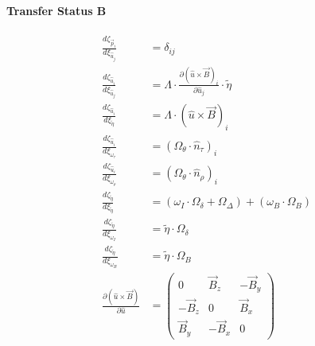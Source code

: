 \documentclass[review]{elsarticle}
\begin{document}
\paragraph{Transfer Status B}
\begin{equation} \begin{alignedat}{-1}
    \frac{d\zeta_{\vec{p}_{i}}}{d\xi_{\hat{u}_{j}}}&=\delta_{ij} \\
    \frac{d\zeta_{\hat{u}_{i}}}{d\xi_{\hat{u}_{j}}}&=\Lambda\cdot\frac{\partial(\hat{u}\times\vec{B})_{i}}{\partial\hat{u}_{j}}\cdot\tilde{\eta} \\
    \frac{d\zeta_{\hat{u}_{i}}}{d\xi_{\tilde{\eta}}}&=\Lambda\cdot(\hat{u}\times\vec{B})_{i} \\
    \frac{d\zeta_{\hat{u}_{i}}}{d\xi_{\omega_{\tau}}}&=(\Omega_{\theta}\cdot\hat{n}_{\tau})_{i} \\
    \frac{d\zeta_{\hat{u}_{i}}}{d\xi_{\omega_{\rho}}}&=(\Omega_{\theta}\cdot\hat{n}_{\rho})_{i} \\
    \frac{d\zeta_{\tilde{\eta}}}{d\xi_{\tilde{\eta}}}&=\left(\omega_{I}\cdot\Omega_{\delta}+\Omega_{\Delta}\right)+\left(\omega_{B}\cdot\Omega_{B}\right)\\
    \frac{d\zeta_{\tilde{\eta}}}{d\xi_{\omega_{I}}}&=\tilde{\eta}\cdot\Omega_{\delta} \\
    \frac{d\zeta_{\tilde{\eta}}}{d\xi_{\omega_{B}}}&=\tilde{\eta}\cdot\Omega_{B} \\
    \frac{\partial(\hat{u}\times\vec{B})}{\partial\hat{u}}&=\left(\begin{array}{rrr}
        0            &  \vec{B}_{z} & -\vec{B}_{y} \\
        -\vec{B}_{z} &            0 &  \vec{B}_{x} \\
         \vec{B}_{y} & -\vec{B}_{x} &            0 
    \end{array}\right) \\
\end{alignedat} \end{equation} 
\end{document}
